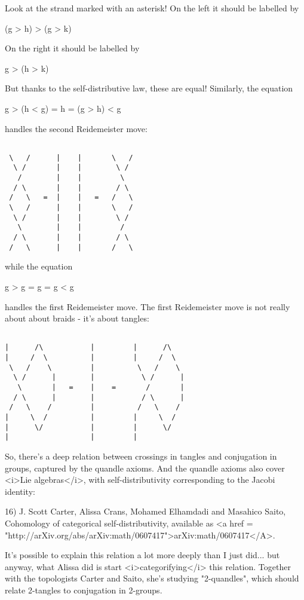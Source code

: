 Look at the strand marked with an asterisk!  On the left it should be
labelled by

(g > h) > (g > k)

On the right it should be labelled by 

g > (h > k)

But thanks to the self-distributive law, these are equal!  Similarly,
the equation 

g > (h < g) = h = (g > h) < g

handles the second Reidemeister move:


\begin{verbatim}

 \   /      |    |       \   / 
  \ /       |    |        \ /
   /        |    |         \  
  / \       |    |        / \  
 /   \   =  |    |   =   /   \  
 \   /      |    |       \   /
  \ /       |    |        \ /
   \        |    |         / 
  / \       |    |        / \ 
 /   \      |    |       /   \ 
\end{verbatim}
    
while the equation 

g > g = g = g < g

handles the first Reidemeister move.  The first Reidemeister move is
not really about about braids - it's about tangles: 


\begin{verbatim}

|      /\           |         |      /\
|     /  \          |         |     /  \
 \   /    \         |          \   /    \
  \ /      |        |           \ /      |
   \       |   =    |    =       /       |
  / \      |        |           / \      |
 /   \    /         |          /   \    /
|     \  /          |         |     \  / 
|      \/           |         |      \/
|                   |         |    
\end{verbatim}
    

So, there's a deep relation between crossings in tangles and
conjugation in groups, captured by the quandle axioms.  And the
quandle axioms also cover <i>Lie algebras</i>, with self-distributivity
corresponding to the Jacobi identity:

16) J. Scott Carter, Alissa Crans, Mohamed Elhamdadi and Masahico
Saito, Cohomology of categorical self-distributivity, available
as <a href = "http://arXiv.org/abs/arXiv:math/0607417">arXiv:math/0607417</A>.

It's possible to explain this relation a lot more deeply than I just
did... but anyway, what Alissa did is start <i>categorifying</i> this
relation.  Together with the topologists Carter and Saito, she's
studying "2-quandles", which should relate 2-tangles to
conjugation in 2-groups.

